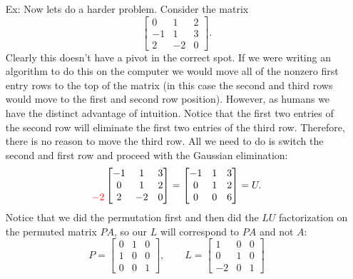 \documentclass[reqno]{amsart}
\theoremstyle{definition}
\begin{document}
\begin{itemize}
\item[Ex:  ]  Now lets do a harder problem.  Consider the matrix
%
\begin{equation*}
\begin{bmatrix}
0 & 1 & 2\\
-1 & 1 & 3\\
2 & -2 & 0
\end{bmatrix}.
\end{equation*}
%
Clearly this doesn't have a pivot in the correct spot.  If we were writing an algorithm to do this on the computer we would move all of the nonzero first entry rows to the top of the matrix (in this case the second and third rows would move to the first and second row position).  However, as humans we have the distinct advantage of intuition.  Notice that the first two entries of the second row will eliminate the first two entries of the third row.  Therefore, there is no reason to move the third row.  All we need to do is switch the second and first row and proceed with the Gaussian elimination:
%
\begin{equation*}
\begin{matrix}
 \\
 \\
{\color{red}-2}
\end{matrix}\begin{bmatrix}
-1 & 1 & 3\\
0 & 1 & 2\\
2 & -2 & 0
\end{bmatrix} = \begin{bmatrix}
-1 & 1 & 3\\
0 & 1 & 2\\
0 & 0 & 6
\end{bmatrix} = U.
\end{equation*}
%
Notice that we did the permutation first and then did the $LU$ factorization on the permuted matrix $PA$, so our $L$ will correspond to $PA$ and not $A$:
%
\begin{equation*}
P = \begin{bmatrix}
0 & 1 & 0\\
1 & 0 & 0\\
0 & 0 & 1
\end{bmatrix},\qquad L = \begin{bmatrix}
1 & 0 & 0\\
0 & 1 & 0\\
-2 & 0 & 1
\end{bmatrix}
\end{equation*}


\end{itemize}
\end{document}

